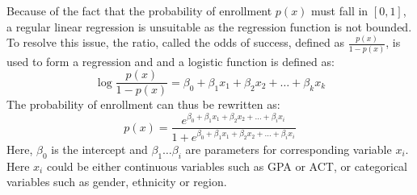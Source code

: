 \documentclass[12pt,english]{report}
\begin{document}
Because of the fact that the probability of enrollment $p(x)$ must fall in $[0,1]$, a regular linear regression is unsuitable as the regression function is not bounded. To resolve this issue, the ratio, called the odds of success, defined as  $\frac{p(x)}{1-p(x)}$,  is used to form a regression and and a logistic function is defined as:
\begin{equation}
\ensuremath{\log\frac{p(x)}{1-p(x)}=\beta_0+\beta_1 x_1+\beta_2 x_2 +\ldots+\beta_k x_k}
\end{equation}
The probability of enrollment can thus be rewritten as:
\begin{equation}
	p(x)=\frac{e^{\beta_0+\beta_1 x_1+\beta_2 x_2 +\ldots+\beta_i x_i}}{1+e^{\beta_0+\beta_1 x_1+\beta_2 x_2 +\ldots+\beta_i x_i}}%
\end{equation}
Here, $\beta_0$ is the intercept and $\beta_1 \ldots \beta_i$ are parameters for corresponding variable $x_i$.  Here $x_i$ could be either continuous variables such as GPA or  ACT, or categorical variables such as gender, ethnicity or region. 

\end{document}
